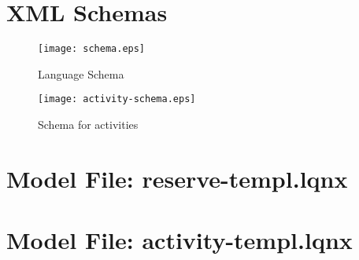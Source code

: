 \documentclass[11pt]{article}
\begin{document}
\section{XML Schemas}

\begin{figure}[h!]
  \centering
  \texttt{[image: schema.eps]}
  \caption{Language Schema}
  \label{fig:schema}
\end{figure}

\begin{figure}[h!]
  \centering
  \texttt{[image: activity-schema.eps]}
  \caption{Schema for activities}
  \label{fig:schema-activities}
\end{figure}

\clearpage
\section{Model File: reserve-templ.lqnx}
\label{sec:reserve-templ.lqnx}
\lstset{basicstyle=\ttfamily\footnotesize,stringstyle=\emph,columns=fullflexible}

\clearpage
\section{Model File: activity-templ.lqnx}
\label{activity-templ.lqnx}

\clearpage
\printindex
\end{document}
